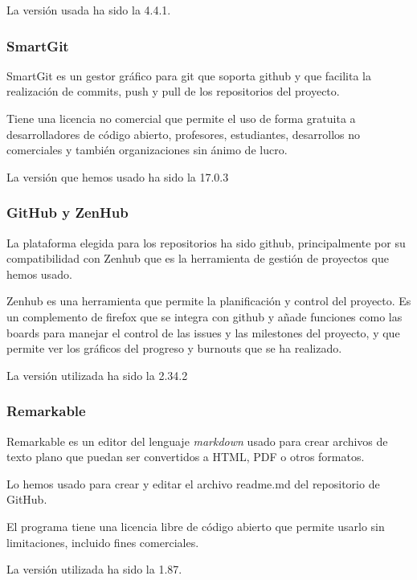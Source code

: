 La versión usada ha sido la 4.4.1.

\subsubsection{SmartGit}
SmartGit es un gestor gráfico para git que soporta github y que facilita la realización de commits, push y pull de los repositorios del proyecto.

Tiene una licencia no comercial que permite el uso de forma gratuita a desarrolladores de código abierto, profesores, estudiantes, desarrollos no comerciales y también organizaciones sin ánimo de lucro.

La versión que hemos usado ha sido la 17.0.3

\subsubsection{GitHub y ZenHub}
La plataforma elegida para los repositorios ha sido github, principalmente por su compatibilidad con Zenhub que es la herramienta de gestión de proyectos que hemos usado.

Zenhub es una herramienta que permite la planificación y control del proyecto. Es un complemento de firefox que se integra con github y añade funciones como las boards para manejar el control de las issues y las milestones del proyecto, y que permite ver los gráficos del progreso y burnouts que se ha realizado.

La versión utilizada ha sido la 2.34.2

\subsubsection{Remarkable}
Remarkable es un editor del lenguaje \textit{markdown} usado para crear archivos de texto plano que puedan ser convertidos a HTML, PDF o otros formatos.

Lo hemos usado para crear y editar el archivo readme.md del repositorio de GitHub.

El programa tiene una licencia libre de código abierto que permite usarlo sin limitaciones, incluido fines comerciales.

La versión utilizada ha sido la 1.87.
